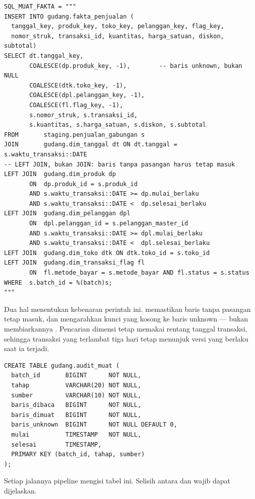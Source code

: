 \begin{lstlisting}[style=pythongaya]
SQL_MUAT_FAKTA = """
INSERT INTO gudang.fakta_penjualan (
  tanggal_key, produk_key, toko_key, pelanggan_key, flag_key,
  nomor_struk, transaksi_id, kuantitas, harga_satuan, diskon, subtotal)
SELECT dt.tanggal_key,
       COALESCE(dp.produk_key, -1),        -- baris unknown, bukan NULL
       COALESCE(dtk.toko_key, -1),
       COALESCE(dpl.pelanggan_key, -1),
       COALESCE(fl.flag_key, -1),
       s.nomor_struk, s.transaksi_id,
       s.kuantitas, s.harga_satuan, s.diskon, s.subtotal
FROM       staging.penjualan_gabungan s
JOIN       gudang.dim_tanggal dt ON dt.tanggal = s.waktu_transaksi::DATE
-- LEFT JOIN, bukan JOIN: baris tanpa pasangan harus tetap masuk
LEFT JOIN  gudang.dim_produk dp
       ON  dp.produk_id = s.produk_id
       AND s.waktu_transaksi::DATE >= dp.mulai_berlaku
       AND s.waktu_transaksi::DATE <  dp.selesai_berlaku
LEFT JOIN  gudang.dim_pelanggan dpl
       ON  dpl.pelanggan_id = s.pelanggan_master_id
       AND s.waktu_transaksi::DATE >= dpl.mulai_berlaku
       AND s.waktu_transaksi::DATE <  dpl.selesai_berlaku
LEFT JOIN  gudang.dim_toko dtk ON dtk.toko_id = s.toko_id
LEFT JOIN  gudang.dim_transaksi_flag fl
       ON  fl.metode_bayar = s.metode_bayar AND fl.status = s.status
WHERE  s.batch_id = %(batch)s;
"""
\end{lstlisting}

Dua hal menentukan kebenaran perintah ini.  memastikan
baris tanpa pasangan tetap masuk, dan  mengarahkan
kunci yang kosong ke baris unknown --- bukan membiarkannya .
Pencarian dimensi tetap memakai rentang tanggal transaksi, sehingga transaksi
yang terlambat tiga hari tetap menunjuk versi yang berlaku saat ia terjadi.


\begin{lstlisting}[style=sqlgaya]
CREATE TABLE gudang.audit_muat (
  batch_id       BIGINT      NOT NULL,
  tahap          VARCHAR(20) NOT NULL,
  sumber         VARCHAR(10) NOT NULL,
  baris_dibaca   BIGINT      NOT NULL,
  baris_dimuat   BIGINT      NOT NULL,
  baris_unknown  BIGINT      NOT NULL DEFAULT 0,
  mulai          TIMESTAMP   NOT NULL,
  selesai        TIMESTAMP,
  PRIMARY KEY (batch_id, tahap, sumber)
);
\end{lstlisting}

Setiap jalannya pipeline mengisi tabel ini. Selisih antara
 dan  wajib dapat dijelaskan.

